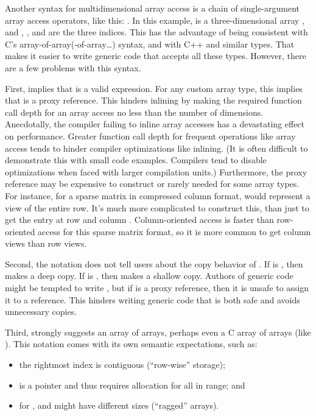 \documentclass{wg21}
\begin{document}
Another syntax for multidimensional array access is a chain of single-argument array access operators, like this: .  In this example,  is a three-dimensional array , and , , and  are the three indices.  This has the advantage of being consistent with C's array-of-array(-of-array\ldots) syntax, and with C++  and similar types.  That makes it easier to write generic code that accepts all these types.  However, there are a few problems with this syntax.

First,  implies that  is a valid expression.  For any custom array type, this implies that  is a proxy reference.  This hinders inlining by making the required function call depth for an array access no less than the number of dimensions.  Anecdotally, the compiler failing to inline array accesses has a devastating effect on performance.  Greater function call depth for frequent operations like array access tends to hinder compiler optimizations like inlining.  (It is often difficult to demonstrate this with small code examples.  Compilers tend to disable optimizations when faced with larger compilation units.)  Furthermore, the proxy reference  may be expensive to construct or rarely needed for some array types.  For instance, for a sparse matrix in compressed column format,  would represent a view of the entire row.  It's much more complicated to construct this, than just to get the entry at row  and column .  Column-oriented access is faster than row-oriented access for this sparse matrix format, so it is more common to get column views than row views.

Second, the notation  does not tell users about the copy behavior of .  If  is , then  makes a deep copy.  If  is , then  makes a shallow copy.  Authors of generic code might be tempted to write , but if  is a proxy reference, then it is unsafe to assign it to a reference.  This hinders writing generic code that is both safe and avoids unnecessary copies.

Third,  strongly suggests an array of arrays, perhaps even a C array of arrays (like ).  This notation comes with its own semantic expectations, such as:

\begin{itemize}
\item the rightmost index is contiguous (``row-wise'' storage);
\item {} is a pointer and thus requires allocation for all  in range; and
\item for ,  and  might have different sizes (``ragged'' arrays).
\end{itemize}
\end{document}
